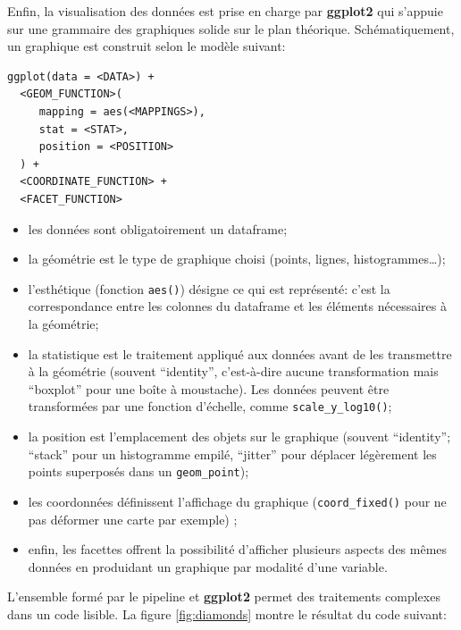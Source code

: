 \documentclass[
  11pt,
  french,
  a4paper,
  extrafontsizes,onecolumn,openright
  ]{memoir}
\providecommand{\tightlist}{%
  \setlength{\itemsep}{0pt}\setlength{\parskip}{0pt}}
\begin{document}
Enfin, la visualisation des données est prise en charge par \textbf{ggplot2} qui s'appuie sur une grammaire des graphiques \autocite{Wickham2010} solide sur le plan théorique.
Schématiquement, un graphique est construit selon le modèle suivant:

\begin{verbatim}
ggplot(data = <DATA>) + 
  <GEOM_FUNCTION>(
     mapping = aes(<MAPPINGS>),
     stat = <STAT>, 
     position = <POSITION>
  ) +
  <COORDINATE_FUNCTION> +
  <FACET_FUNCTION>
\end{verbatim}

\begin{itemize}
\tightlist
\item
  les données sont obligatoirement un dataframe;
\item
  la géométrie est le type de graphique choisi (points, lignes, histogrammes\ldots);
\item
  l'esthétique (fonction \texttt{aes()}) désigne ce qui est représenté: c'est la correspondance entre les colonnes du dataframe et les éléments nécessaires à la géométrie;
\item
  la statistique est le traitement appliqué aux données avant de les transmettre à la géométrie (souvent ``identity'', c'est-à-dire aucune transformation mais ``boxplot'' pour une boîte à moustache).
  Les données peuvent être transformées par une fonction d'échelle, comme \texttt{scale\_y\_log10()};
\item
  la position est l'emplacement des objets sur le graphique (souvent ``identity''; ``stack'' pour un histogramme empilé, ``jitter'' pour déplacer légèrement les points superposés dans un \texttt{geom\_point});
\item
  les coordonnées définissent l'affichage du graphique (\texttt{coord\_fixed()} pour ne pas déformer une carte par exemple) ;
\item
  enfin, les facettes offrent la possibilité d'afficher plusieurs aspects des mêmes données en produidant un graphique par modalité d'une variable.
\end{itemize}

L'ensemble formé par le pipeline et \textbf{ggplot2} permet des traitements complexes dans un code lisible.
La figure \ref{fig:diamonds} montre le résultat du code suivant:



\scriptsize
\end{document}
